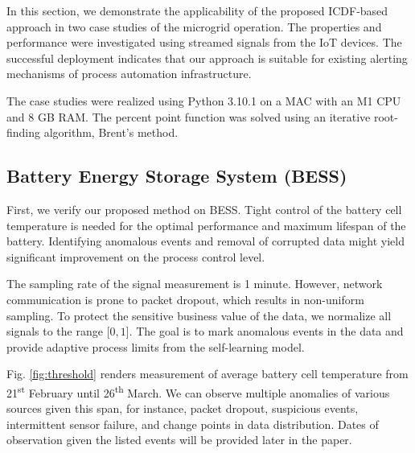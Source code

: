 In this section, we demonstrate the applicability of the proposed ICDF-based approach in two case studies of the microgrid operation. The properties and performance were investigated using streamed signals from the IoT devices. The successful deployment indicates that our approach is suitable for existing alerting mechanisms of process automation infrastructure.

The case studies were realized using Python 3.10.1 on a MAC with an M1 CPU and 8 GB RAM. The percent point function was solved using an iterative root-finding algorithm, Brent's method.

\subsection{Battery Energy Storage System (BESS)}\label{AA:Case1}
First, we verify our proposed method on BESS. Tight control of the battery cell temperature is needed for the optimal performance and maximum lifespan of the battery. Identifying anomalous events and removal of corrupted data might yield significant improvement on the process control level. 

The sampling rate of the signal measurement is 1 minute. However, network communication is prone to packet dropout, which results in non-uniform sampling. To protect the sensitive business value of the data, we normalize all signals to the range $[0, 1$]. The goal is to mark anomalous events in the data and provide adaptive process limits from the self-learning model. 

Fig. \ref{fig:threshold} renders measurement of average battery cell temperature from 21\textsuperscript{st} February until 26\textsuperscript{th} March. We can observe multiple anomalies of various sources given this span, for instance, packet dropout, suspicious events, intermittent sensor failure, and change points in data distribution. Dates of observation given the listed events will be provided later in the paper. 

